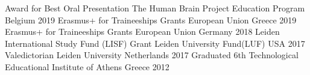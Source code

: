



\begin{cvhonors}

  \cvhonor
    {Award for Best Oral Presentation} %
    {The Human Brain Project Education Program} %
    {Belgium} %
    {2019} %
   \cvhonor
	{Erasmus+ for Traineeships Grants} %
	{European Union} %
	{Greece} %
	{2019} %
   \cvhonor
	{Erasmus+ for Traineeships Grants} %
	{European Union} %
	{Germany} %
	{2018} %
   \cvhonor
	{Leiden International Study Fund (LISF) Grant} %
	{Leiden University Fund(LUF)} %
	{USA} %
	{2017} %
   \cvhonor
	{Valedictorian} %
	{Leiden University} %
	{Netherlands} %
	{2017} %
   \cvhonor
	{Graduated 6th} %
	{Technological Educational Institute of Athens} %
	{Greece} %
	{2012} %
\end{cvhonors}






